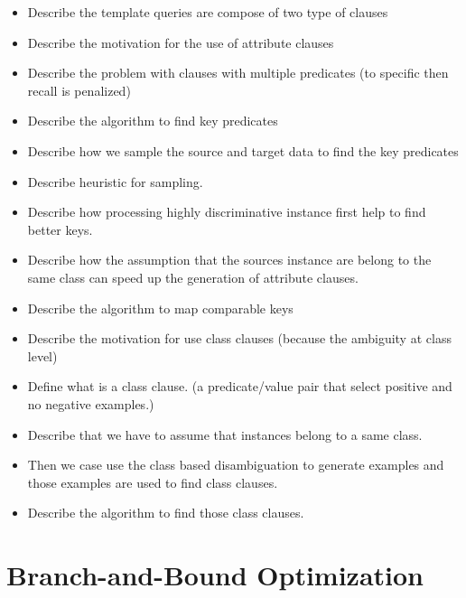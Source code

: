 \begin{itemize}

\item Describe the template queries are compose of two type of clauses
\item Describe the motivation for the use of attribute clauses
\item Describe the problem with clauses with multiple predicates (to specific then recall is penalized)
\item Describe the algorithm to find key predicates
\item Describe how we sample the source and target data to find the key predicates
\item Describe heuristic for sampling. 
\item Describe how processing highly discriminative instance first help to find better keys.
\item Describe how the assumption that the sources instance are belong to the same class can speed up the generation of attribute clauses.
\item Describe the algorithm to map comparable keys

\item Describe the motivation for use class clauses (because the ambiguity at class level)
\item Define what is a class clause. (a predicate/value pair that select positive and no negative examples.)
\item Describe that we have to assume that instances belong to a same class. 
\item Then we case use the class based disambiguation to generate examples and those examples are used to find class clauses.
\item Describe the algorithm to find those class clauses.

\end{itemize}

\section{Branch-and-Bound Optimization}

